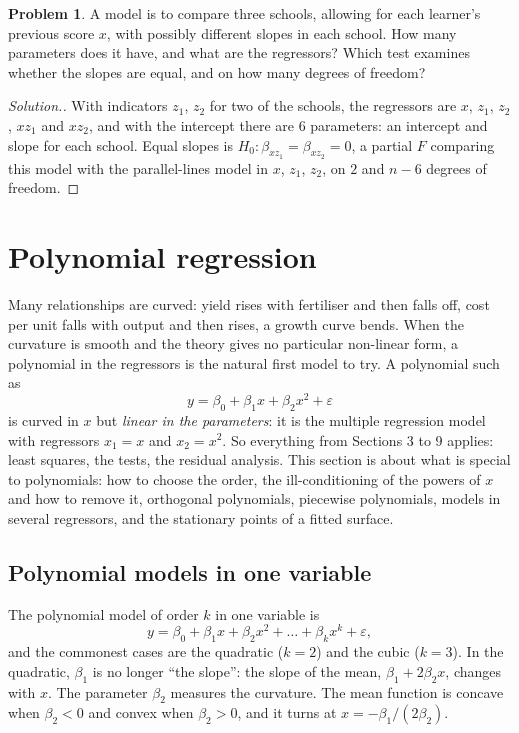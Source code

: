 \documentclass[11pt,a4paper]{article}
\numberwithin{equation}{section}
\theoremstyle{definition}
\newtheorem{problemx}{Problem}[subsection]
\newenvironment{problem}{\begin{problemx}}{\end{problemx}}
\newenvironment{solution}
  {\renewcommand{\qedsymbol}{}\begin{proof}[\textit{Solution}.]}
  {\end{proof}}
\begin{document}
\begin{problem}\label{prob:three-level-x}
A model is to compare three schools, allowing for each learner's previous score $x$, with possibly different
slopes in each school. How many parameters does it have, and what are the regressors? Which test examines
whether the slopes are equal, and on how many degrees of freedom?
\end{problem}

\begin{solution}
With indicators $z_1$, $z_2$ for two of the schools, the regressors are $x$, $z_1$, $z_2$, $xz_1$ and $xz_2$, and with the
intercept there are $6$ parameters: an intercept and slope for each school. Equal slopes is
$H_0\colon \beta_{xz_1} = \beta_{xz_2} = 0$, a partial $F$ comparing this model with the parallel-lines model in $x$, $z_1$, $z_2$, on
$2$ and $n - 6$ degrees of freedom.
\end{solution}

\section{Polynomial regression}
Many relationships are curved: yield rises with fertiliser and then falls off, cost per unit falls with
output and then rises, a growth curve bends. When the curvature is smooth and the theory gives no
particular non-linear form, a polynomial in the regressors is the natural first model to try. A
polynomial such as
\[
y = \beta_0 + \beta_1x + \beta_2x^2 + \varepsilon
\]
is curved in $x$ but \emph{linear in the parameters}: it is the multiple regression model with regressors
$x_1 = x$ and $x_2 = x^2$. So everything from Sections 3 to 9 applies: least squares, the tests, the
residual analysis. This section is about what is special to polynomials: how to choose the order, the
ill-conditioning of the powers of $x$ and how to remove it, orthogonal polynomials, piecewise
polynomials, models in several regressors, and the stationary points of a fitted surface.

\subsection{Polynomial models in one variable}
The polynomial model of order $k$ in one variable is
\[
y = \beta_0 + \beta_1x + \beta_2x^2 + \dots + \beta_kx^k + \varepsilon ,
\]
and the commonest cases are the quadratic ($k = 2$) and the cubic ($k = 3$). In the quadratic, $\beta_1$ is no longer
``the slope'': the slope of the mean, $\beta_1 + 2\beta_2x$, changes with $x$. The parameter $\beta_2$ measures the
curvature. The mean function is concave when $\beta_2 < 0$ and convex when $\beta_2 > 0$, and it turns at
$x = -\beta_1/(2\beta_2)$.
\end{document}
